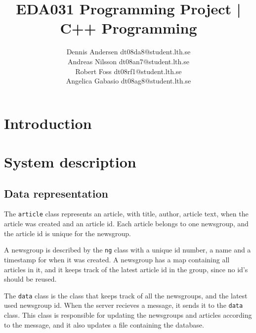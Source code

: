 \documentclass[12pt]{article}
\title{EDA031 Programming Project | C++ Programming}
\author{Dennis Andersen dt08da8@student.lth.se\\
Andreas Nilsson dt08an7@student.lth.se\\
Robert Foss dt08rf1@student.lth.se\\
Angelica Gabasio dt08ag8@student.lth.se}
\begin{document}
\maketitle
\newpage

\section{Introduction}

\section{System description}

\subsection*{Data representation}
The \verb!article! class represents an article, with title, author, article text, when the article was created and an article id. Each article belongs to one newsgroup, and the article id is unique for the newsgroup.

A newsgroup is described by the \verb!ng! class with a unique id number, a name and a timestamp for when it was created. A newsgroup has a map containing all articles in it, and it keeps track of the latest article id in the group, since no id's should be reused.

The \verb!data! class is the class that keeps track of all the newsgroups, and the latest used newsgroup id. When the server recieves a message, it sends it to the \verb!data! class. This class is responsible for updating the newsgroups and articles according to the message, and it also updates a file containing the database.

\end{document}
